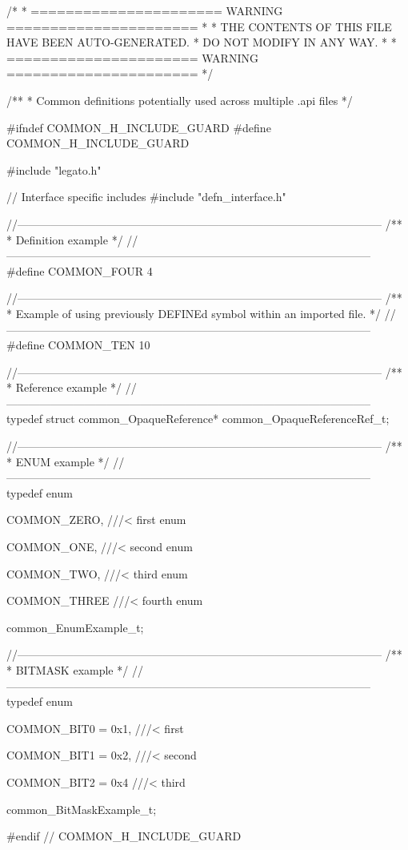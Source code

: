 \begin{DoxyVerbInclude}
/*
 * ====================== WARNING ======================
 *
 * THE CONTENTS OF THIS FILE HAVE BEEN AUTO-GENERATED.
 * DO NOT MODIFY IN ANY WAY.
 *
 * ====================== WARNING ======================
 */

/**
 * Common definitions potentially used across multiple .api files
 */

#ifndef COMMON_H_INCLUDE_GUARD
#define COMMON_H_INCLUDE_GUARD


#include "legato.h"

// Interface specific includes
#include "defn_interface.h"



//--------------------------------------------------------------------------------------------------
/**
 * Definition example
 */
//--------------------------------------------------------------------------------------------------
#define COMMON_FOUR 4


//--------------------------------------------------------------------------------------------------
/**
 * Example of using previously DEFINEd symbol within an imported file.
 */
//--------------------------------------------------------------------------------------------------
#define COMMON_TEN 10


//--------------------------------------------------------------------------------------------------
/**
 * Reference example
 */
//--------------------------------------------------------------------------------------------------
typedef struct common_OpaqueReference* common_OpaqueReferenceRef_t;


//--------------------------------------------------------------------------------------------------
/**
 * ENUM example
 */
//--------------------------------------------------------------------------------------------------
typedef enum
{
    COMMON_ZERO,
        ///< first enum

    COMMON_ONE,
        ///< second enum

    COMMON_TWO,
        ///< third enum

    COMMON_THREE
        ///< fourth enum
}
common_EnumExample_t;


//--------------------------------------------------------------------------------------------------
/**
 * BITMASK example
 */
//--------------------------------------------------------------------------------------------------
typedef enum
{
    COMMON_BIT0 = 0x1,
        ///< first

    COMMON_BIT1 = 0x2,
        ///< second

    COMMON_BIT2 = 0x4
        ///< third
}
common_BitMaskExample_t;


#endif // COMMON_H_INCLUDE_GUARD

\end{DoxyVerbInclude}


